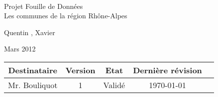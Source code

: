 \documentclass[a4paper]{article}
\begin{document}
\begin{titlepage}
~
\vfill
\begin{center}
\begin{Huge}
Projet Fouille de Données\\ Les communes de la région Rhône-Alpes \end{Huge}
\vfill
Quentin , Xavier \\
\vfill
\begin{Large}
Mars 2012
\end{Large}
\vfill
\begin{tabular}{|c|c|c|c|c|}
  \hline
   Destinataire & Version & Etat & Dernière révision \\
   \hline
   Mr. Bouliquot & 1 & Validé & \today \\
   \hline
\end{tabular}
\end{center}
\vfill
\end{titlepage}
\newpage
\tableofcontents
\newpage




\end{document}
